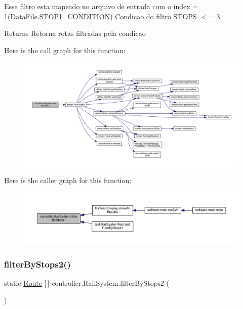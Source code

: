 Esse filtro esta mapeado no arquivo de entrada com o index = 1(\hyperlink{classutilities_1_1_data_file_a73169a0777ef2c7e224420ab3f4be9dc}{Data\+File.\+S\+T\+O\+P1\+\_\+\+C\+O\+N\+D\+I\+T\+I\+ON}) Condicao do filtro S\+T\+O\+PS $<$= 3

\begin{DoxyReturn}{Returns}
Retorna rotas filtradas pela condicao 
\end{DoxyReturn}
Here is the call graph for this function\+:\nopagebreak
\begin{figure}[H]
\begin{center}
\leavevmode
\includegraphics[width=350pt]{classcontroller_1_1_rail_system_aecab2f33307d056fc39b715421705d62_cgraph}
\end{center}
\end{figure}
Here is the caller graph for this function\+:\nopagebreak
\begin{figure}[H]
\begin{center}
\leavevmode
\includegraphics[width=350pt]{classcontroller_1_1_rail_system_aecab2f33307d056fc39b715421705d62_icgraph}
\end{center}
\end{figure}
\mbox{\label{classcontroller_1_1_rail_system_aac5dfeee25bd54a9a4bbdb64d52acf9f}} 
\subsubsection{\texorpdfstring{filter\+By\+Stops2()}{filterByStops2()}}
{\footnotesize\ttfamily static \hyperlink{classdomain_1_1_route}{Route} \mbox{[}$\,$\mbox{]} controller.\+Rail\+System.\+filter\+By\+Stops2 (\begin{DoxyParamCaption}{ }\end{DoxyParamCaption})\hspace{0.3cm}{\ttfamily [static]}}

